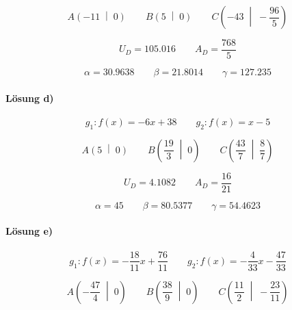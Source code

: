 \begin{equation*}
  A\left(\num{-11}\;\middle|\;\num{0}\right)
  \qquad
  B\left(\num{5}\;\middle|\;\num{0}\right)
  \qquad
  C\left(\num{-43}\;\middle|\;-\frac{\num{96}}{\num{5}}\right)
\end{equation*}

\begin{equation*}
  U_D=\num{105.016}
  \qquad
  A_D=\frac{\num{768}}{\num{5}}
\end{equation*}

\begin{equation*}
  \alpha=\num{30.9638}
  \qquad
  \beta=\num{21.8014}
  \qquad
  \gamma=\num{127.235}
\end{equation*}

\paragraph{Lösung d)}
\begin{equation*}
  g_1:f(x)=-\num{6}x+\num{38}
  \qquad
  g_2:f(x)=x-\num{5}
\end{equation*}

\begin{equation*}
  A\left(\num{5}\;\middle|\;\num{0}\right)
  \qquad
  B\left(\frac{\num{19}}{\num{3}}\;\middle|\;\num{0}\right)
  \qquad
  C\left(\frac{\num{43}}{\num{7}}\;\middle|\;\frac{\num{8}}{\num{7}}\right)
\end{equation*}

\begin{equation*}
  U_D=\num{4.1082}
  \qquad
  A_D=\frac{\num{16}}{\num{21}}
\end{equation*}

\begin{equation*}
  \alpha=\num{45}
  \qquad
  \beta=\num{80.5377}
  \qquad
  \gamma=\num{54.4623}
\end{equation*}

\paragraph{Lösung e)}
\begin{equation*}
  g_1:f(x)=-\frac{\num{18}}{\num{11}}x+\frac{\num{76}}{\num{11}}
  \qquad
  g_2:f(x)=-\frac{\num{4}}{\num{33}}x-\frac{\num{47}}{\num{33}}
\end{equation*}

\begin{equation*}
  A\left(-\frac{\num{47}}{\num{4}}\;\middle|\;\num{0}\right)
  \qquad
  B\left(\frac{\num{38}}{\num{9}}\;\middle|\;\num{0}\right)
  \qquad
  C\left(\frac{\num{11}}{\num{2}}\;\middle|\;-\frac{\num{23}}{\num{11}}\right)
\end{equation*}

